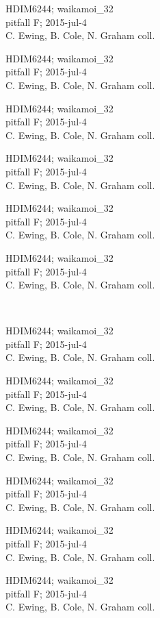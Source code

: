 \documentclass[2pt]{extarticle}
\begin{document}
\noindent
\parbox{0.16\textwidth}{\tiny \raggedright \rule[-0.3\baselineskip]{0pt}{10pt}HDIM6244; waikamoi\_32\\ pitfall F; 2015-jul-4\\ C. Ewing, B. Cole, N. Graham coll.}
\parbox{0.16\textwidth}{\tiny \raggedright \rule[-0.3\baselineskip]{0pt}{10pt}HDIM6244; waikamoi\_32\\ pitfall F; 2015-jul-4\\ C. Ewing, B. Cole, N. Graham coll.}
\parbox{0.16\textwidth}{\tiny \raggedright \rule[-0.3\baselineskip]{0pt}{10pt}HDIM6244; waikamoi\_32\\ pitfall F; 2015-jul-4\\ C. Ewing, B. Cole, N. Graham coll.}
\parbox{0.16\textwidth}{\tiny \raggedright \rule[-0.3\baselineskip]{0pt}{10pt}HDIM6244; waikamoi\_32\\ pitfall F; 2015-jul-4\\ C. Ewing, B. Cole, N. Graham coll.}
\parbox{0.16\textwidth}{\tiny \raggedright \rule[-0.3\baselineskip]{0pt}{10pt}HDIM6244; waikamoi\_32\\ pitfall F; 2015-jul-4\\ C. Ewing, B. Cole, N. Graham coll.}
\parbox{0.16\textwidth}{\tiny \raggedright \rule[-0.3\baselineskip]{0pt}{10pt}HDIM6244; waikamoi\_32\\ pitfall F; 2015-jul-4\\ C. Ewing, B. Cole, N. Graham coll.} \\ 
\vspace{0.001in} 

\noindent
\parbox{0.16\textwidth}{\tiny \raggedright \rule[-0.3\baselineskip]{0pt}{10pt}HDIM6244; waikamoi\_32\\ pitfall F; 2015-jul-4\\ C. Ewing, B. Cole, N. Graham coll.}
\parbox{0.16\textwidth}{\tiny \raggedright \rule[-0.3\baselineskip]{0pt}{10pt}HDIM6244; waikamoi\_32\\ pitfall F; 2015-jul-4\\ C. Ewing, B. Cole, N. Graham coll.}
\parbox{0.16\textwidth}{\tiny \raggedright \rule[-0.3\baselineskip]{0pt}{10pt}HDIM6244; waikamoi\_32\\ pitfall F; 2015-jul-4\\ C. Ewing, B. Cole, N. Graham coll.}
\parbox{0.16\textwidth}{\tiny \raggedright \rule[-0.3\baselineskip]{0pt}{10pt}HDIM6244; waikamoi\_32\\ pitfall F; 2015-jul-4\\ C. Ewing, B. Cole, N. Graham coll.}
\parbox{0.16\textwidth}{\tiny \raggedright \rule[-0.3\baselineskip]{0pt}{10pt}HDIM6244; waikamoi\_32\\ pitfall F; 2015-jul-4\\ C. Ewing, B. Cole, N. Graham coll.}
\parbox{0.16\textwidth}{\tiny \raggedright \rule[-0.3\baselineskip]{0pt}{10pt}HDIM6244; waikamoi\_32\\ pitfall F; 2015-jul-4\\ C. Ewing, B. Cole, N. Graham coll.}
\end{document}
